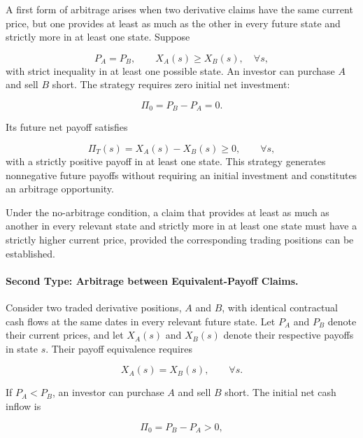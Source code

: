 A first form of arbitrage arises when two
derivative claims have the same current price,
but one provides at least as much as the other
in every future state and strictly more in at
least one state. Suppose

\begin{equation}
P_A=P_B,
\qquad
X_A(s)\geq X_B(s), \quad \forall s,
\label{eq:ch11-payoff-dominance}
\end{equation}
with strict inequality in at least one possible
state. An investor can purchase $A$ and sell $B$
short. The strategy requires zero initial net
investment:

\begin{equation}
\Pi_0=P_B-P_A=0.
\end{equation}

Its future net payoff satisfies

\begin{equation}
\Pi_T(s)=X_A(s)-X_B(s)\geq 0,
\qquad \forall s,
\end{equation}
with a strictly positive payoff in at least
one state. This strategy generates nonnegative
future payoffs without requiring an initial
investment and constitutes an arbitrage
opportunity.

Under the no-arbitrage condition, a claim that
provides at least as much as another in every
relevant state and strictly more in at least one
state must have a strictly higher current price,
provided the corresponding trading positions
can be established.

\paragraph{Second Type: Arbitrage between Equivalent-Payoff Claims.}

Consider two traded derivative positions, $A$ and
$B$, with identical contractual cash flows at the
same dates in every relevant future state. Let
$P_A$ and $P_B$ denote their current prices, and
let $X_A(s)$ and $X_B(s)$ denote their respective
payoffs in state $s$. Their payoff equivalence
requires

\begin{equation}
X_A(s)=X_B(s),
\qquad \forall s.
\label{eq:ch11-equivalent-derivative-payoffs}
\end{equation}

If $P_A<P_B$, an investor can purchase $A$ and
sell $B$ short. The initial net cash inflow is

\begin{equation}
\Pi_0=P_B-P_A>0,
\end{equation}


